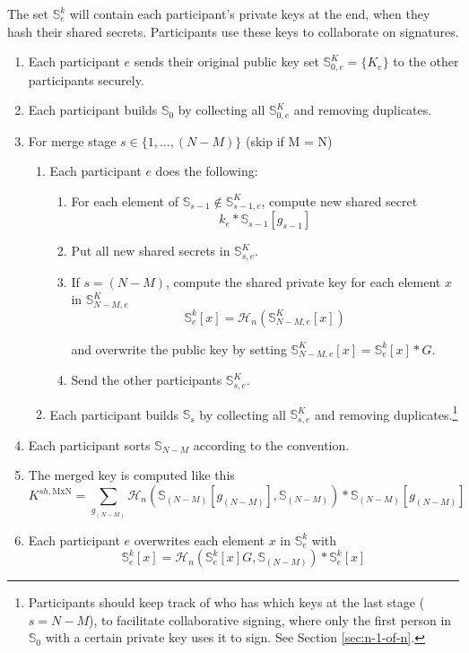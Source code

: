 The set $\mathbb{S}^k_{e}$ will contain each participant's private keys at the end, when they hash their shared secrets. Participants use these keys to collaborate on signatures.
\begin{enumerate}
    \item Each participant $e$ sends their original public key set $\mathbb{S}^K_{0,e} = \{K_e\}$ to the other participants securely.
    \item Each participant builds $\mathbb{S}_{0}$ by collecting all $\mathbb{S}^K_{0,e}$ and removing duplicates.
    \item For merge stage $s \in \{1,...,(N-M)\}$ (skip if M = N)
    \begin{enumerate}
        \item Each participant $e$ does the following:
        \begin{enumerate}
            \item For each element of $\mathbb{S}_{s-1} \notin \mathbb{S}^K_{s-1,e}$, compute new shared secret
            \[ k_e*\mathbb{S}_{s-1}[g_{s-1}] \]
            \item Put all new shared secrets in $\mathbb{S}^K_{s,e}$.
            \item If $s = (N-M)$, compute the shared private key for each element $x$ in $\mathbb{S}^K_{N-M,e}$
            \[ \mathbb{S}^k_{e}[x] = \mathcal{H}_n(\mathbb{S}^K_{N-M,e}[x]) \]
            
            and overwrite the public key by setting $\mathbb{S}^K_{N-M,e}[x] = \mathbb{S}^k_{e}[x]*G$.
            \item Send the other participants $\mathbb{S}^K_{s,e}$.
        \end{enumerate}
        \item Each participant builds $\mathbb{S}_{s}$ by collecting all $\mathbb{S}^K_{s,e}$ and removing duplicates.\footnote{Participants should keep track of who has which keys at the last stage ($s = N-M$), to facilitate collaborative signing, where only the first person in $\mathbb{S}_0$ with a certain private key uses it to sign. See Section \ref{sec:n-1-of-n}.}
    \end{enumerate}
    \item Each participant sorts $\mathbb{S}_{N-M}$ according to the convention.
    \item The merged key is computed like this
    \[K^{sh,\textrm{MxN}} = \sum_{g_{(N-M)}} \mathcal{H}_n(\mathbb{S}_{(N-M)}[g_{(N-M)}],\mathbb{S}_{(N-M)})*\mathbb{S}_{(N-M)}[g_{(N-M)}]\]
    \item Each participant $e$ overwrites each element $x$ in $\mathbb{S}^k_{e}$ with
    \[ \mathbb{S}^k_{e}[x] = \mathcal{H}_n(\mathbb{S}^k_{e}[x] G,\mathbb{S}_{(N-M)})*\mathbb{S}^k_{e}[x] \]
\end{enumerate}

